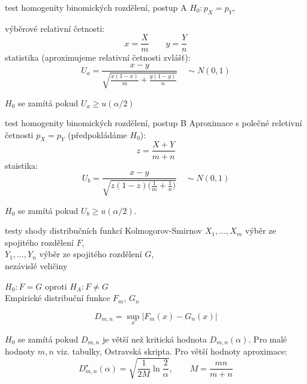 \documentclass[smaller]{beamer}
\def\abs#1{\lvert#1\rvert}
\def\xskip{{\vspace{2ex}}}
\begin{document}
\begin{frame}{test homogenity binomických rozdělení, postup A}
$H_0: p_X = p_Y$, 

výběrové relativní četnosti:
\[
 x=\frac{X}{m}\qquad y=\frac{Y}{n}
\]
statistika (aproximujeme relativní četnosti zvlášť):
\[
 U_a = \frac{x-y}{\sqrt{\frac{x(1-x)}{m} + \frac{y(1-y)}{n}}} \quad \sim N(0,1)
\]

$H_0$ se zamítá pokud $U_a \ge u(\alpha / 2)$ 
\end{frame}

\begin{frame}{test homogenity binomických rozdělení, postup B}
Aproximace s polečné reletivní četnosti $p_X = p_Y$ (předpokládáme $H_0$):
\[
 z = \frac{X + Y}{m+n}
\]
staistika:
\[
 U_b = \frac{x-y}{\sqrt{z(1-z)\big(\frac{1}{m} + \frac{1}{n}\big)}} \quad \sim N(0,1)
\]

$H_0$ se zamítá pokud $U_b \ge u(\alpha / 2)$. 
\end{frame}


\begin{frame}{testy shody distribučních funkcí Kolmogorov-Smirnov}
$X_1, \dots ,X_m$ výběr ze spojitého rozdělení $F$,\\
$Y_1, \dots ,Y_n$ výběr ze spojitého rozdělení $G$,\\
nezávislé veličiny

\xskip
$H_0: F=G$ oproti $H_A: F\ne G$\\
Empirické distribuční funkce $F_m$, $G_n$

\[
 D_{m,n} = \sup_{x}\abs{F_m(x) - G_n(x)}
\]

$H_0$ se zamítá pokud $D_{m,n}$ je větší než kritická hodnota $D_{m,n}(\alpha)$. Pro malé hodnoty $m,n$ viz. tabulky, Ostravská skripta.
Pro větší hodnoty aproximace:
\[
 D^\star_{m,n}(\alpha) = \sqrt{\frac{1}{2M} \ln\frac{2}{\alpha}}, \qquad M = \frac{mn}{m+n}
\]
\end{frame}
\end{document}
